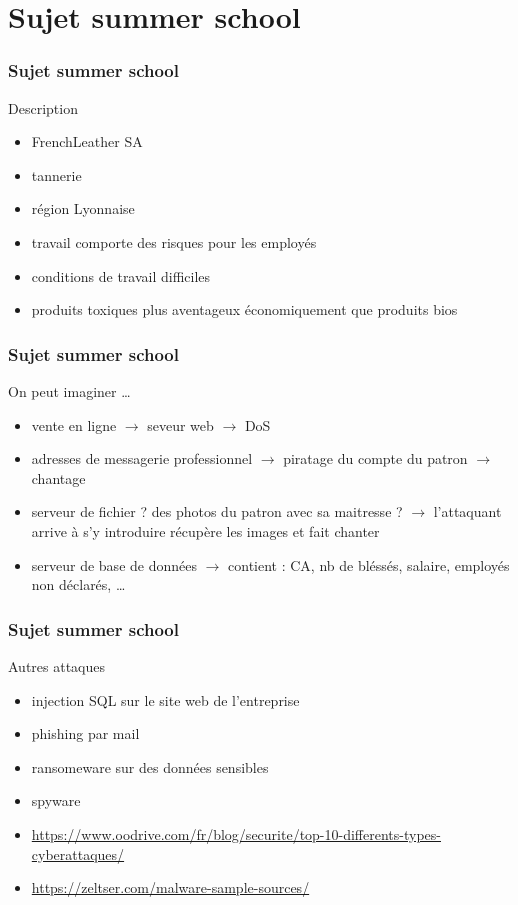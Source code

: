 \documentclass{beamer}
\begin{document}
	\section{Sujet summer school}
		\begin{frame}
			\frametitle{Sujet summer school}
			\begin{block}{Description}
				\begin{itemize}
					\item FrenchLeather SA
					\item tannerie
					\item région Lyonnaise
					\item travail comporte des risques pour les employés
					\item conditions de travail difficiles
					\item produits toxiques plus aventageux économiquement que produits bios
				\end{itemize}
			\end{block}
		\end{frame}
		\begin{frame}
			\frametitle{Sujet summer school}
			\begin{block}{On peut imaginer \ldots}
				\begin{itemize}
					\item vente en ligne $\rightarrow$ seveur web $\rightarrow$ DoS
					\item adresses de messagerie professionnel $\rightarrow$ piratage du compte du patron $\rightarrow$ chantage
					\item serveur de fichier ? des photos du patron avec sa maitresse ? $\rightarrow$ l'attaquant arrive à s'y introduire récupère les images et fait chanter
					\item serveur de base de données $\rightarrow$ contient : CA, nb de bléssés, salaire, employés non déclarés, \ldots
				\end{itemize}
			\end{block}
		\end{frame}
		\begin{frame}
			\frametitle{Sujet summer school}
			\begin{block}{Autres attaques}
				\begin{itemize}
					\item injection SQL sur le site web de l'entreprise
					\item phishing par mail
					\item ransomeware sur des données sensibles
					\item spyware
				\end{itemize}
			\end{block}
		\end{frame}
	\begin{frame}
		\begin{itemize}
			\item \url{https://www.oodrive.com/fr/blog/securite/top-10-differents-types-cyberattaques/}
			\item \url{https://zeltser.com/malware-sample-sources/}
		\end{itemize}
	\end{frame}
\end{document}

